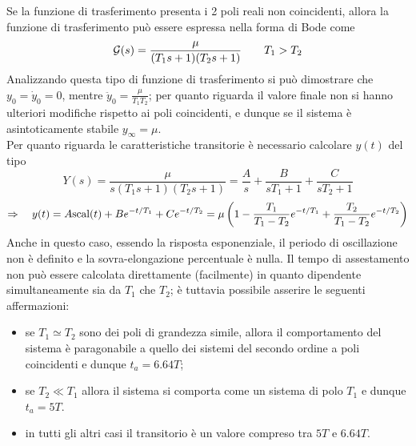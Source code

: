 		\vspace{3mm}
		Se la funzione di trasferimento presenta i 2 poli reali non coincidenti, allora la funzione di trasferimento può essere espressa nella forma di Bode come
		\[\mathcal G(s) = \frac{\mu}{(T_1s + 1)(T_2s+1)} \qquad T_1 > T_2\]
		Analizzando questa tipo di funzione di trasferimento si può dimostrare che $y_0 = \dot y_0 = 0$, mentre $\ddot y_0 = \frac \mu {T_1T_2}$; per quanto riguarda il valore finale non si hanno ulteriori modifiche rispetto ai poli  coincidenti, e dunque se il sistema è asintoticamente stabile $y_\infty=\mu$. \\
		Per quanto riguarda le caratteristiche transitorie è necessario calcolare $y(t)$ del tipo
		\[ Y(s) = \frac{\mu}{s(T_1s + 1)(T_2s+1)} = \frac As + \frac B{sT_1 + 1} + \frac C{sT_2 + 1}  \]
		\[\Rightarrow\quad y(t) = A\textrm{scal}(t) + Be^{-t/T_1} + C e^{-t/T_2} = \mu \left(1 - \frac {T_1}{T_1-T_2}e^{-t/T_1} + \frac {T_2}{T_1-T_2} e^{-t/T_2}\right)\]
		Anche in questo caso, essendo la risposta esponenziale, il periodo di oscillazione non è definito e la sovra-elongazione percentuale è nulla. Il tempo di assestamento non può essere calcolata direttamente (facilmente) in quanto dipendente simultaneamente sia da $T_1$ che $T_2$; è tuttavia possibile asserire le seguenti affermazioni:
		\begin{itemize}
			\item se $T_1\simeq T_2$ sono dei poli di grandezza simile, allora il comportamento del sistema è paragonabile a quello dei sistemi del secondo ordine a poli coincidenti e dunque $t_a =6.64T$;
			\item se $T_2\ll T_1$ allora il sistema si comporta come un sistema di polo $T_1$ e dunque $t_a = 5T$.
			\item in tutti gli altri casi il transitorio è un valore compreso tra $5T$ e $6.64T$.
		\end{itemize}
	
